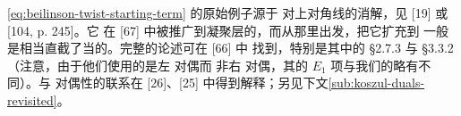 \begin{remark}\label{thm:beilinson-spectral-sequence-origin}
\trSpectralSequence{} \eqref{eq:beilinson-twist-starting-term} 的原始例子源于%
\trBeilinson{}对\trProjectiveSpace{}上对角线的消解，见 [19] 或 [104, p. 245]。它
在 [67] 中被推广到凝聚层的\trExceptionalCollection，而从那里出发，把它扩充到
一般\trTriangulated{}\trCategory{}是相当直截了当的。完整的论述可在 [66] 中
找到，特别是其中的 §2.7.3 与 §3.3.2（注意，由于他们使用的是左 \trKoszul{}对偶而
非右 \trKoszul{}对偶，其\trSpectralSequence{}的 $E_1$ 项与我们的略有不同）。与%
\trKoszul{}对偶性的联系在 [26]、[25] 中得到解释；另见下文\cref{sub:koszul-duals-revisited}。
\end{remark}
